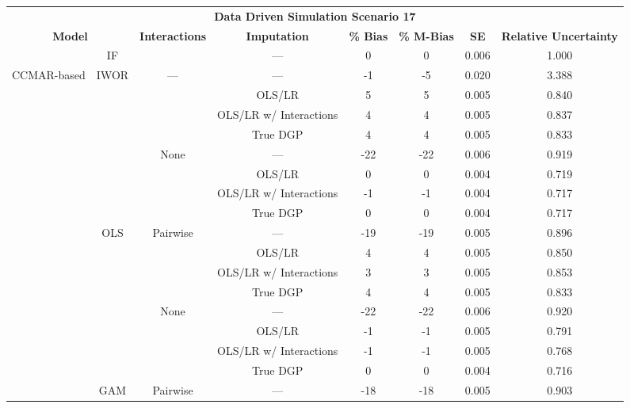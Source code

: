 \begin{table}
\centering
\begin{tabular}[ht]{|>{}c|c|c|c|c|c|c|>{}c|}
\hline
\multicolumn{8}{|c|}{\textbf{Data Driven Simulation Scenario 17}} \\
\cline{1-8}
\multicolumn{2}{|c|}{\textbf{Model}} & \textbf{Interactions} & \textbf{Imputation} & \textbf{\% Bias} & \textbf{\% M-Bias} & \textbf{SE} & \textbf{Relative Uncertainty}\\
\hline
 & IF &  & --- & 0 & 0 & 0.006 & 1.000\\
\cline{2-2}
\cline{4-8}
\multirow{-2}{*}{\centering\arraybackslash CCMAR-based} & IWOR & \multirow{-2}{*}{\centering\arraybackslash ---} & --- & -1 & -5 & 0.020 & 3.388\\
\cline{1-8}
 &  &  & OLS/LR & 5 & 5 & 0.005 & 0.840\\
\cline{4-8}
 &  &  & OLS/LR w/ Interactions & 4 & 4 & 0.005 & 0.837\\
\cline{4-8}
 &  &  & True DGP & 4 & 4 & 0.005 & 0.833\\
\cline{4-8}
 &  & \multirow{-4}{*}{\centering\arraybackslash None} & --- & -22 & -22 & 0.006 & 0.919\\
\cline{3-8}
 &  &  & OLS/LR & 0 & 0 & 0.004 & 0.719\\
\cline{4-8}
 &  &  & OLS/LR w/ Interactions & -1 & -1 & 0.004 & 0.717\\
\cline{4-8}
 &  &  & True DGP & 0 & 0 & 0.004 & 0.717\\
\cline{4-8}
 & \multirow{-8}{*}{\centering\arraybackslash OLS} & \multirow{-4}{*}{\centering\arraybackslash Pairwise} & --- & -19 & -19 & 0.005 & 0.896\\
\cline{2-8}
 &  &  & OLS/LR & 4 & 4 & 0.005 & 0.850\\
\cline{4-8}
 &  &  & OLS/LR w/ Interactions & 3 & 3 & 0.005 & 0.853\\
\cline{4-8}
 &  &  & True DGP & 4 & 4 & 0.005 & 0.833\\
\cline{4-8}
 &  & \multirow{-4}{*}{\centering\arraybackslash None} & --- & -22 & -22 & 0.006 & 0.920\\
\cline{3-8}
 &  &  & OLS/LR & -1 & -1 & 0.005 & 0.791\\
\cline{4-8}
 &  &  & OLS/LR w/ Interactions & -1 & -1 & 0.005 & 0.768\\
\cline{4-8}
 &  &  & True DGP & 0 & 0 & 0.004 & 0.716\\
\cline{4-8}
 & \multirow{-8}{*}{\centering\arraybackslash GAM} & \multirow{-4}{*}{\centering\arraybackslash Pairwise} & --- & -18 & -18 & 0.005 & 0.903\\

\end{tabular}
\end{table}
